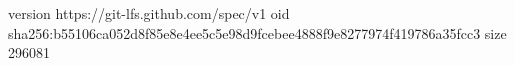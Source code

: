 version https://git-lfs.github.com/spec/v1
oid sha256:b55106ca052d8f85e8e4ee5c5e98d9fcebee4888f9e8277974f419786a35fcc3
size 296081
